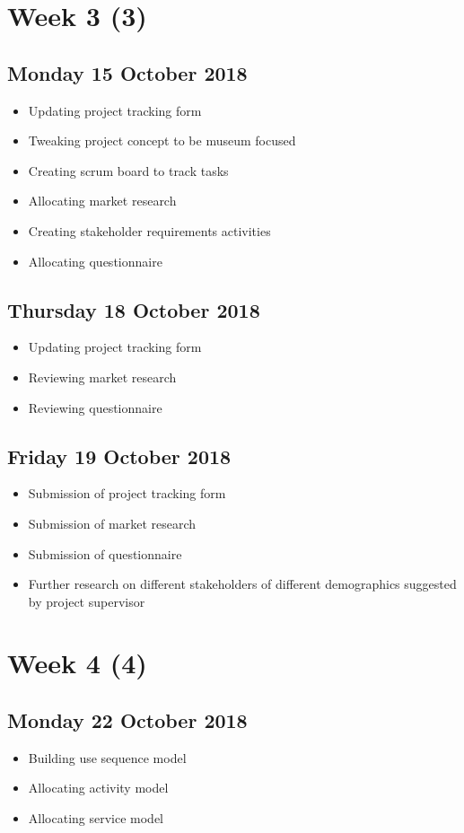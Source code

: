 \section*{Week 3 (3)}
\subsection*{Monday 15 October 2018}
\begin{itemize}
    \item Updating project tracking form
	\item Tweaking project concept to be museum focused 
	\item Creating scrum board to track tasks
	\item Allocating market research
    \item Creating stakeholder requirements activities
	\item Allocating questionnaire
\end{itemize}

\subsection*{Thursday 18 October 2018}
\begin{itemize}
	\item Updating project tracking form
	\item Reviewing market research
	\item Reviewing questionnaire
\end{itemize}

\subsection*{Friday 19 October 2018}
\begin{itemize}
    \item Submission of project tracking form
	\item Submission of market research
	\item Submission of questionnaire
	\item Further research on different stakeholders of different demographics suggested by project supervisor
\end{itemize}

\section*{Week 4 (4)}
\subsection*{Monday 22 October 2018}
\begin{itemize}
    \item Building use sequence model
	\item Allocating activity model
	\item Allocating service model
\end{itemize}

